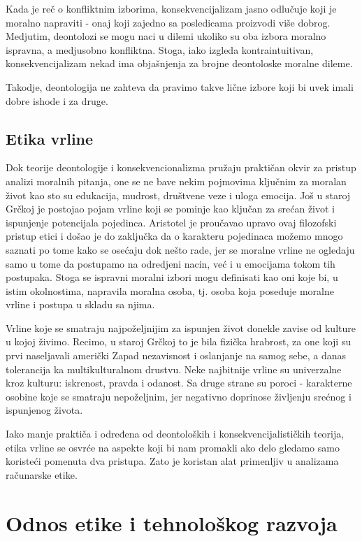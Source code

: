 \documentclass[a4paper]{article}
\begin{document}
Kada je reč o konfliktnim izborima, konsekvencijalizam jasno odlučuje koji je moralno napraviti - onaj koji zajedno sa posledicama proizvodi više dobrog. Medjutim, deontolozi se mogu naci u dilemi ukoliko su oba izbora moralno ispravna, a medjusobno konfliktna. Stoga, iako izgleda kontraintuitivan, konsekvencijalizam nekad ima objašnjenja za brojne deontoloske moralne dileme.

Takodje, deontologija ne zahteva da pravimo takve lične izbore koji bi uvek imali dobre ishode i za druge. 

\subsection{Etika vrline}

Dok teorije deontologije i konsekvencionalizma pružaju praktičan okvir za pristup analizi moralnih pitanja, one se ne bave nekim pojmovima ključnim za moralan život kao sto su edukacija, mudrost, društvene veze i uloga emocija. 
Još u staroj Grčkoj je postojao pojam vrline koji se pominje kao ključan za srećan život i ispunjenje potencijala pojedinca.
Aristotel je proučavao upravo ovaj filozofski pristup etici i došao je do zaključka da o karakteru pojedinaca možemo mnogo saznati po tome kako se osećaju dok nešto rade, jer se moralne vrline ne ogledaju samo u tome da postupamo na odredjeni nacin, već i u emocijama tokom tih postupaka.
Stoga se ispravni moralni izbori mogu definisati kao oni koje bi, u istim okolnostima, napravila moralna osoba, tj. osoba koja poseduje moralne vrline i postupa u skladu sa njima.

Vrline koje se smatraju najpoželjnijim za ispunjen život donekle zavise od kulture u kojoj živimo.
Recimo, u staroj Grčkoj to je bila fizička hrabrost, za one koji su prvi naseljavali američki Zapad nezavisnost i oslanjanje na samog sebe, a danas tolerancija ka multikulturalnom drustvu.
Neke najbitnije vrline su univerzalne kroz kulturu: iskrenost, pravda i odanost.
Sa druge strane su poroci - karakterne osobine koje se smatraju nepoželjnim, jer negativno doprinose življenju srećnog i ispunjenog života. 

Iako manje praktiča i određena od deontoloških i konsekvencijalističkih teorija, etika vrline se osvrće na aspekte koji bi nam promakli ako delo gledamo samo koristeći pomenuta dva pristupa. Zato je koristan alat primenljiv u analizama računarske etike. 

\section{Odnos etike i tehnološkog razvoja}
\end{document}

